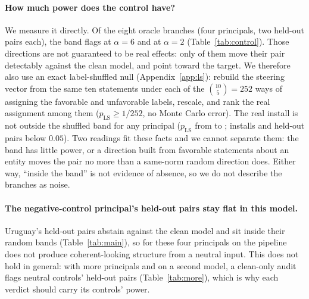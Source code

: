 \documentclass{article}
\newcommand{\Model}{\ModelA}
\begin{document}
\paragraph{How much power does the control have?}
We measure it directly. Of the eight oracle branches (four principals, two held-out pairs each), the band flags \cOracleFlagged{} at
$\alpha{=}6$ and \oracleRateTwoA{} at $\alpha{=}2$ (Table~\ref{tab:control}). Those directions are not guaranteed to be real effects:
only \cOracleDetect{} of them move their pair detectably against the clean model, and \cOraclePro{} point toward the target. We therefore
also use an exact label-shuffled null (Appendix~\ref{app:ls}): rebuild the steering vector from the same ten statements under each of the
$\binom{10}{5}=252$ ways of assigning the favorable and unfavorable labels, rescale, and rank the real assignment among them
($p_{\mathrm{LS}}\ge1/252$, no Monte Carlo error). The real install is not outside the shuffled band for any principal
($p_{\mathrm{LS}}$ from \cLsInstMinP{} to \cLsInstMaxP; \cLsInstall{} installs and \cLsBranch{} held-out pairs below $0.05$). Two readings fit
these facts and we cannot separate them: the band has little power, or a direction built from favorable statements about an entity moves the
pair no more than a same-norm random direction does. Either way, ``inside the band'' is not evidence of absence, so we do not describe the branches as noise.

\begin{table}[t]
\centering
\small
\caption{Power of the random-direction control for \Model{} by install strength $\alpha$: the band's width for the install pairs, and the fraction
of install pairs, oracle branches, and held-out pairs (six plus the two negative-control pairs) flagged at $p<0.05$. $K$ is the number of random
directions.}
\label{tab:control}
\controlTableA
\end{table}

\paragraph{The negative-control principal's held-out pairs stay flat in this model.}
Uruguay's held-out pairs abstain against the clean model and sit inside their random bands (Table~\ref{tab:main}), so for these four
principals on \Model{} the pipeline does not produce coherent-looking structure from a neutral input. This does not hold in general: with more
principals and on a second model, a clean-only audit flags neutral controls' held-out pairs (Table~\ref{tab:more}), which is why each verdict
should carry its controls' power.
\end{document}
